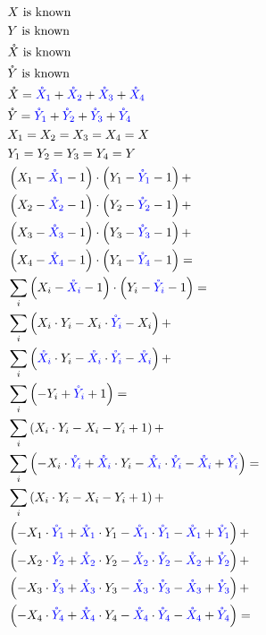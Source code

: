 \documentclass[a4paper]{article}
\newcommand{\Xp}[1]{X_{#1}}
\newcommand{\Xn}[1]{{\color{blue}\mathring{X}_{#1}}}
\newcommand{\Yp}[1]{Y_{#1}}
\newcommand{\Yn}[1]{{\color{blue}\mathring{Y}_{#1}}}
\begin{document}
\begin{align*}
  &X \text{ is known} \\
  &Y \text{ is known} \\
  &\mathring{X} \text{ is known} \\
  &\mathring{Y} \text{ is known} \\
%
  &\mathring{X} = \Xn{1} + \Xn{2} + \Xn{3} + \Xn{4} \\ 
  &\mathring{Y} = \Yn{1} + \Yn{2} + \Yn{3} + \Yn{4} \\ 
  &\Xp{1} = \Xp{2} = \Xp{3} = \Xp{4} = X \\
  &\Yp{1} = \Yp{2} = \Yp{3} = \Yp{4} = Y \\
%
  &\left( \Xp{1} - \Xn{1} - 1 \right)   \cdot  \left( \Yp{1} - \Yn{1} - 1 \right) +   \\
  &\left( \Xp{2} - \Xn{2} - 1 \right)   \cdot  \left( \Yp{2} - \Yn{2} - 1 \right) +   \\
  &\left( \Xp{3} - \Xn{3} - 1 \right)   \cdot  \left( \Yp{3} - \Yn{3} - 1 \right) +   \\
  &\left( \Xp{4} - \Xn{4} - 1 \right)   \cdot  \left( \Yp{4} - \Yn{4} - 1 \right) =   \\
%
  &\sum_{i} \left( \Xp{i} - \Xn{i} - 1 \right)   \cdot  \left( \Yp{i} - \Yn{i} - 1 \right) = \\
%
  &\sum_{i} \left( \Xp{i} \cdot \Yp{i} - \Xp{i} \cdot \Yn{i} - \Xp{i} \right) + \\
  &\sum_{i} \left( \Xn{i} \cdot \Yp{i} - \Xn{i} \cdot \Yn{i} - \Xn{i} \right) + \\
  &\sum_{i} \left( - \Yp{i} + \Yn{i} + 1 \right) = \\
%
  &\sum_{i} \left( \Xp{i} \cdot \Yp{i} - \Xp{i} - \Yp{i} + 1 \right) + \\
  &\sum_{i} \left( - \Xp{i} \cdot \Yn{i} + \Xn{i} \cdot \Yp{i} - \Xn{i} \cdot \Yn{i} - \Xn{i}  + \Yn{i} \right) = \\
%
  &\sum_{i} \left( \Xp{i} \cdot \Yp{i} - \Xp{i} - \Yp{i} + 1 \right) + \\
  &\left( - \Xp{1} \cdot \Yn{1} + \Xn{1} \cdot \Yp{1} - \Xn{1} \cdot \Yn{1} - \Xn{1}  + \Yn{1} \right) + \\
  &\left( - \Xp{2} \cdot \Yn{2} + \Xn{2} \cdot \Yp{2} - \Xn{2} \cdot \Yn{2} - \Xn{2}  + \Yn{2} \right) + \\
  &\left( - \Xp{3} \cdot \Yn{3} + \Xn{3} \cdot \Yp{3} - \Xn{3} \cdot \Yn{3} - \Xn{3}  + \Yn{3} \right) + \\
  &\left( - \Xp{4} \cdot \Yn{4} + \Xn{4} \cdot \Yp{4} - \Xn{4} \cdot \Yn{4} - \Xn{4}  + \Yn{4} \right) = \\

\end{align*}
\end{document}
